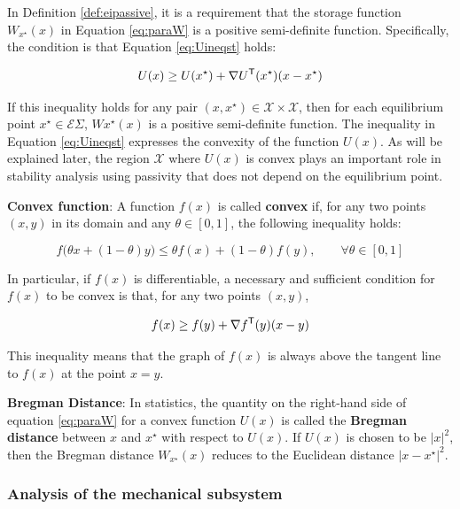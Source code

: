\documentclass[graybox, envcountchap]{svmult}
\begin{document}
In Definition \ref{def:eipassive}, it is a requirement that the storage function
$W_{x^{\star}}(x)$ in Equation \ref{eq:paraW} is a positive semi-definite
function. Specifically, the condition is that Equation \ref{eq:Uineqst} holds:

\begin{equation}\label{eq:Uineqst}
  U(x) \geq  U(x^{\star}) + \nabla U^{\sf T}(x^{\star}) (x-x^{\star})
\end{equation}

If this inequality holds for any pair $(x,x^{\star}) \in \mathcal{X} \times
\mathcal{X}$, then for each equilibrium point $x^{\star} \in
\mathcal{E}{\Sigma}$, $W{x^{\star}}(x)$ is a positive semi-definite function.
The inequality in Equation \ref{eq:Uineqst} expresses the convexity of the
function $U(x)$. As will be explained later, the region $\mathcal{X}$ where
$U(x)$ is convex plays an important role in stability analysis using passivity
that does not depend on the equilibrium point.

\begin{COLUMN}
\noindent \textbf{Convex function}:
A function $f(x)$ is called \textbf{convex} if, for any two points $(x,y)$ in
its domain and any $\theta \in [0,1]$, the following inequality holds:

\[
  f\bigl(
  \theta x + (1-\theta) y
  \bigr)
  \leq \theta f(x) + (1- \theta) f(y)
  ,\qquad
  \forall \theta \in [0,1]
\]

In particular, if $f(x)$ is differentiable, a necessary and sufficient condition
for $f(x)$ to be convex is that, for any two points $(x,y)$,

\[
  f(x) \geq f(y) + \nabla f^{\sf T}(y)(x-y)
\]

This inequality means that the graph of $f(x)$ is always above the tangent line
to $f(x)$ at the point $x=y$.

\smallskip
\noindent \textbf{Bregman Distance}:
In statistics, the quantity on the right-hand side of equation \ref{eq:paraW}
for a convex function $U(x)$ is called the \textbf{Bregman distance}
\cite{bregman1967relaxation} between $x$ and $x^{\star}$ with respect to $U(x)$.
If $U(x)$ is chosen to be $|x|^2$, then the Bregman distance $W_{x^{\star}}(x)$
reduces to the Euclidean distance $|x-x^{\star}|^2$.
\end{COLUMN}

\smallskip
\subsubsection{Analysis of the mechanical subsystem}
\end{document}
